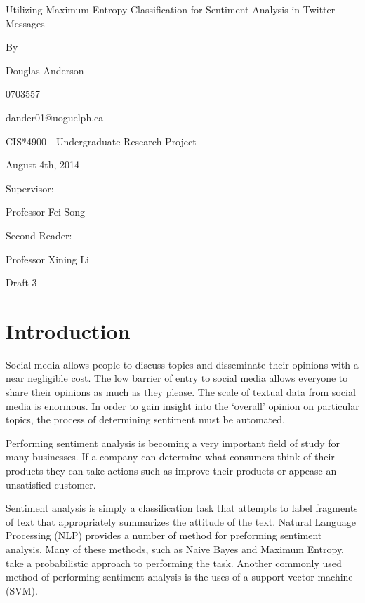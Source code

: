 \documentclass[final,3p,12pt]{elsarticle}
\begin{document}
\thispagestyle{empty}
\begin{center}

\huge

Utilizing Maximum Entropy Classification for Sentiment Analysis in Twitter Messages

\large
\vspace{2.0cm}
By

\vspace{1.0cm}
Douglas Anderson

0703557

dander01@uoguelph.ca

\vspace{1.5cm}
CIS*4900 - Undergraduate Research Project

August 4th, 2014 %

\vspace{1.5cm}

Supervisor:

Professor Fei Song

\vspace{1.5cm}

Second Reader:

Professor Xining Li

\vspace{1.5cm}

Draft 3 %

\end{center}

\newpage
\setcounter{page}{1}

\section{Introduction}
\label{section:intro}

Social media allows people to discuss topics and disseminate their opinions
with a near negligible cost. The low barrier of entry to social media allows
everyone to share their opinions as much as they please. The scale of textual
data from social media is enormous. In order to gain insight into the `overall'
opinion on particular topics, the process of determining sentiment must be
automated.

Performing sentiment analysis is becoming a very important field of study for
many businesses. If a company can determine what consumers think of their
products they can take actions such as improve their products or appease an
unsatisfied customer.

Sentiment analysis is simply a classification task that attempts to label
fragments of text that appropriately summarizes the attitude of the text.
Natural Language Processing (NLP) provides a number of method for preforming
sentiment analysis. Many of these methods, such as Naive Bayes and Maximum
Entropy, take a probabilistic approach to performing the task. Another commonly
used method of performing sentiment analysis is the uses of a support vector
machine (SVM).
\end{document}
